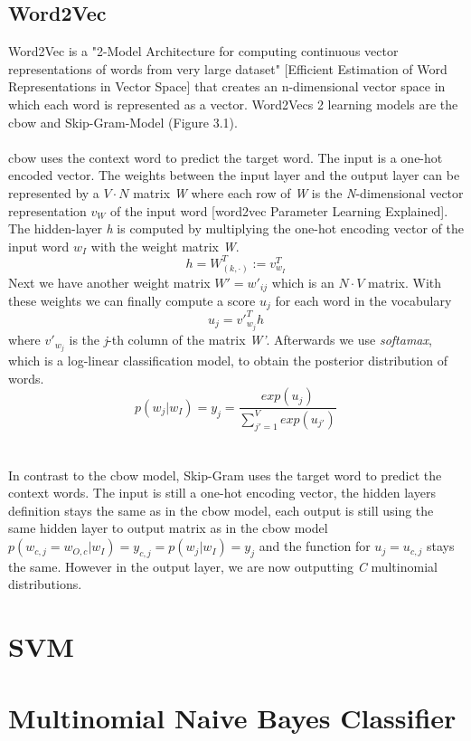 \documentclass[a4paper, 11pt,titlepage,oneside,openany]{book}
\begin{document}
\subsection{Word2Vec}
Word2Vec is a "2-Model Architecture for computing continuous vector representations of words from very large dataset" [Efficient Estimation of Word Representations in Vector Space] that creates an n-dimensional vector space in which each word is represented as a vector. Word2Vecs 2 learning models are the \gls{cbow} and Skip-Gram-Model (Figure 3.1).\\
\\
\noindent \gls{cbow} uses the context word to predict the target word. The input is a one-hot encoded vector. The weights between the input layer and the output layer can be represented by a $V \cdot N$ matrix \textit{W} where each row of \textit{W} is the \textit{N}-dimensional vector representation $v_W$ of the input word [word2vec Parameter Learning Explained]. The hidden-layer \textit{h} is computed by multiplying the one-hot encoding vector of the input word $w_I$ with the weight matrix \textit{W}.
\[
h=W_{(k, \cdot)}^{T}:=v_{w_I}^{T}
\] 
Next we have another weight matrix $W'={w'_{ij}}$ which is an $N \cdot V$ matrix. With these weights we can finally compute a score $u_j$ for each word in the vocabulary
\[
u_{j}={v'}_{w_j}^{T}h
\] where ${v'}_{w_j}$ is the \textit{j}-th column of the matrix \textit{W'}. Afterwards we use \textit{softamax}, which is a log-linear classification model, to obtain the posterior distribution of words.
\[
p(w_j|w_I)=y_j=\frac{exp(u_j)}{\sum_{j'=1}^V exp(u_{j'})}
\] \\
\\
\noindent In contrast to the \gls{cbow} model,  Skip-Gram uses the target word to predict the context words. The input is still a one-hot encoding vector, the hidden layers definition stays the same as in the \gls{cbow} model, each output is still using the same hidden layer to output matrix as in the \gls{cbow} model $p(w_{c,j}=w_{O,c}|w_I)=y_{c,j} = p(w_j|w_I)=y_j$ and the function for $u_j=u_{c,j}$ stays the same. However in the output layer, we are now outputting \textit{C} multinomial distributions. 
\section{SVM}
\section{Multinomial Naive Bayes Classifier}
\end{document}
